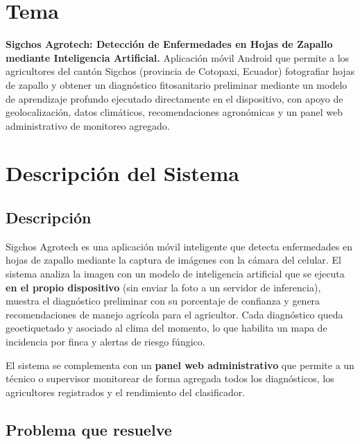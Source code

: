 \documentclass[12pt,a4paper]{article}
\begin{document}
\newpage
{}
\setcounter{page}{1}

\section*{Tema}

\textbf{Sigchos Agrotech: Detección de Enfermedades en Hojas de Zapallo mediante
Inteligencia Artificial.} Aplicación móvil Android que permite a los
agricultores del cantón Sigchos (provincia de Cotopaxi, Ecuador) fotografiar
hojas de zapallo y obtener un diagnóstico fitosanitario preliminar mediante un
modelo de aprendizaje profundo ejecutado directamente en el dispositivo, con
apoyo de geolocalización, datos climáticos, recomendaciones agronómicas y un
panel web administrativo de monitoreo agregado.

\section{Descripción del Sistema}

\subsection{Descripción}

Sigchos Agrotech es una aplicación móvil inteligente que detecta enfermedades en
hojas de zapallo mediante la captura de imágenes con la cámara del celular. El
sistema analiza la imagen con un modelo de inteligencia artificial que se
ejecuta \textbf{en el propio dispositivo} (sin enviar la foto a un servidor de
inferencia), muestra el diagnóstico preliminar con su porcentaje de confianza y
genera recomendaciones de manejo agrícola para el agricultor. Cada diagnóstico
queda geoetiquetado y asociado al clima del momento, lo que habilita un mapa de
incidencia por finca y alertas de riesgo fúngico.

El sistema se complementa con un \textbf{panel web administrativo} que permite
a un técnico o supervisor monitorear de forma agregada todos los diagnósticos,
los agricultores registrados y el rendimiento del clasificador.

\subsection{Problema que resuelve}
\end{document}
